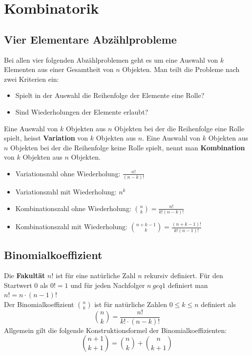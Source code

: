\section{Kombinatorik}
\label{sec:kombinatorik}
\subsection{Vier Elementare Abzählprobleme}
\label{sec:vier-elementare-abzahlp}
Bei allen vier folgenden Abzählproblemen geht es um eine Auswahl von $k$ Elementen aus einer Gesamtheit von
$n$ Objekten. Man teilt die Probleme nach zwei Kriterien ein:
\begin{itemize}
    \item Spielt in der Auswahl die Reihenfolge der Elemente eine Rolle?
    \item Sind Wiederholungen der Elemente erlaubt?
\end{itemize}
Eine Auswahl von $k$ Objekten aus $n$ Objekten bei der die Reihenfolge eine Rolle spielt, 
heisst \textbf{Variation} von $k$ Objekten aus $n$. 
Eine Auswahl von $k$ Objekten aus $n$ Objekten bei der die Reihenfolge keine Rolle spielt, 
nennt man \textbf{Kombination} von $k$ Objekten aus $n$ Objekten.
\begin{itemize}
    \item Variationszahl ohne Wiederholung: $\frac{n!}{(n-k)!}$
    \item Variationszahl mit Wiederholung: $n^k$
    \item Kombinationszahl ohne Wiederholung: $\binom{n}{k} = \frac{n!}{k!(n-k)!}$
    \item Kombinationszahl mit Wiederholung: $\binom{n+k-1}{k} = \frac{(n+k-1)!}{k!(n-1)!}$
\end{itemize}
\subsection{Binomialkoeffizient}
\label{sec:binomialkoeffizient}
Die \textbf{Fakultät} $n!$ ist für eine natürliche Zahl $n$ rekursiv definiert. Für den Startwert $0$ als $0!=1$ 
und für jeden Nachfolger $n\ geq 1$ definiert man $n! = n \cdot (n-1)!$ \\
Der Binomialkoeffizient $\binom{n}{k}$ ist für natürliche Zahlen $0 \leq k \leq n$ definiert als
\begin{equation*}
    \binom{n}{k} = \frac{n!}{k! \cdot (n-k)!}
\end{equation*}
Allgemein gilt die folgende Konstruktionsformel der Binomialkoeffizienten:
\begin{equation*}
    \binom{n+1}{k+1} = \binom{n}{k} + \binom{n}{k+1}
\end{equation*}
